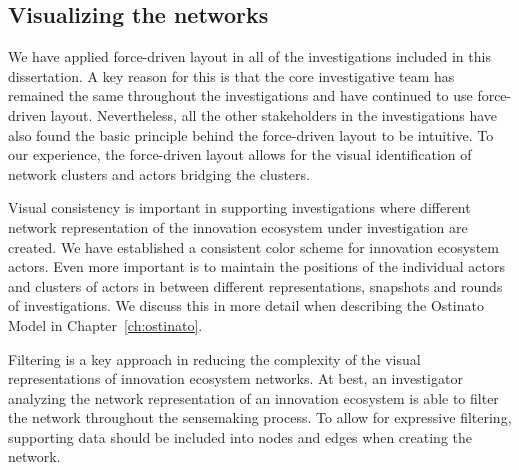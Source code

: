 



\subsection{Visualizing the networks}

We have applied force-driven layout in all of the investigations included in this dissertation. A key reason for this is that the core investigative team has remained the same throughout the investigations and have continued to use force-driven layout. Nevertheless, all the other stakeholders in the investigations have also found the basic principle behind the force-driven layout to be intuitive. To our experience, the force-driven layout allows for the visual identification of network clusters and actors bridging the clusters.

Visual consistency is important in supporting investigations where different network representation of the innovation ecosystem under investigation are created. We have established a consistent color scheme for innovation ecosystem actors. Even more important is to maintain the positions of the individual actors and clusters of actors in between different representations, snapshots and rounds of investigations. We discuss this in more detail when describing the Ostinato Model in Chapter~\ref{ch:ostinato}.

Filtering is a key approach in reducing the complexity of the visual representations of innovation ecosystem networks. At best, an  investigator analyzing the network representation of an innovation ecosystem is able to filter the network throughout the sensemaking process. 
To allow for expressive filtering, supporting data should be included into nodes and edges when creating the network.



